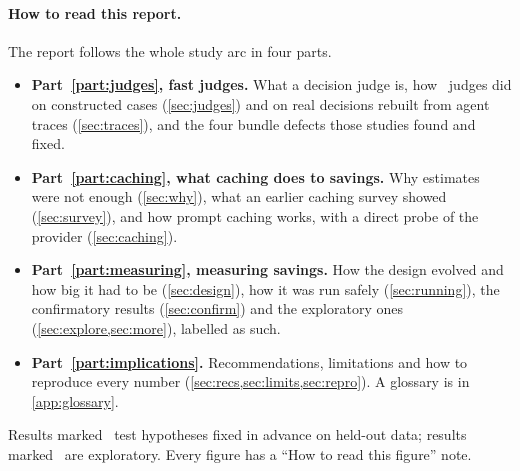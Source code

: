 \paragraph{How to read this report.} The report follows the whole study arc in four parts.
\begin{itemize}
  \item \textbf{Part~\ref{part:judges}, fast judges.} What a decision judge is, how \NumBase\ judges did on
    constructed cases (\cref{sec:judges}) and on real decisions rebuilt from agent traces (\cref{sec:traces}),
    and the four bundle defects those studies found and fixed.
  \item \textbf{Part~\ref{part:caching}, what caching does to savings.} Why estimates were not enough
    (\cref{sec:why}), what an earlier caching survey showed (\cref{sec:survey}), and how prompt caching works,
    with a direct probe of the provider (\cref{sec:caching}).
  \item \textbf{Part~\ref{part:measuring}, measuring savings.} How the design evolved and how big it had to be
    (\cref{sec:design}), how it was run safely (\cref{sec:running}), the confirmatory results
    (\cref{sec:confirm}) and the exploratory ones (\cref{sec:explore,sec:more}), labelled as such.
  \item \textbf{Part~\ref{part:implications}.} Recommendations, limitations and how to reproduce every number
    (\cref{sec:recs,sec:limits,sec:repro}). A glossary is in \cref{app:glossary}.
\end{itemize}
Results marked \prereg\ test hypotheses fixed in advance on held-out data; results marked \screen\ are exploratory.
Every figure has a ``How to read this figure'' note.

